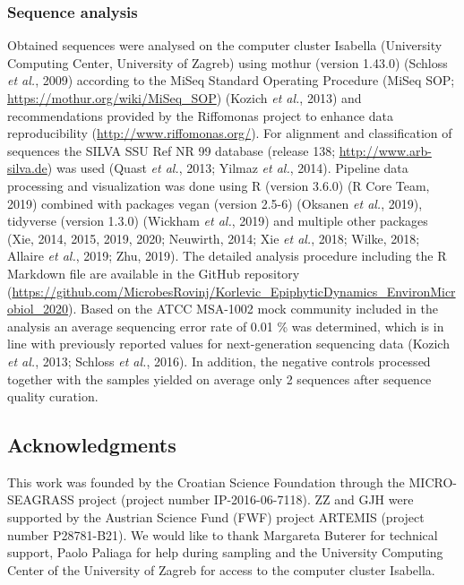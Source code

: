\documentclass[12pt,]{article}
\begin{document}
\hypertarget{sequence-analysis}{%
\subsubsection{Sequence analysis}\label{sequence-analysis}}

Obtained sequences were analysed on the computer cluster Isabella
(University Computing Center, University of Zagreb) using mothur
(version 1.43.0) (Schloss \emph{et al.}, 2009) according to the MiSeq
Standard Operating Procedure (MiSeq SOP;
\url{https://mothur.org/wiki/MiSeq_SOP}) (Kozich \emph{et al.}, 2013)
and recommendations provided by the Riffomonas project to enhance data
reproducibility (\url{http://www.riffomonas.org/}). For alignment and
classification of sequences the SILVA SSU Ref NR 99 database (release
138; \url{http://www.arb-silva.de}) was used (Quast \emph{et al.}, 2013;
Yilmaz \emph{et al.}, 2014). Pipeline data processing and visualization
was done using R (version 3.6.0) (R Core Team, 2019) combined with
packages vegan (version 2.5-6) (Oksanen \emph{et al.}, 2019), tidyverse
(version 1.3.0) (Wickham \emph{et al.}, 2019) and multiple other
packages (Xie, 2014, 2015, 2019, 2020; Neuwirth, 2014; Xie \emph{et
al.}, 2018; Wilke, 2018; Allaire \emph{et al.}, 2019; Zhu, 2019). The
detailed analysis procedure including the R Markdown file are available
in the GitHub repository
(\url{https://github.com/MicrobesRovinj/Korlevic_EpiphyticDynamics_EnvironMicrobiol_2020}).
Based on the ATCC MSA-1002 mock community included in the analysis an
average sequencing error rate of 0.01 \si{\percent} was determined,
which is in line with previously reported values for next-generation
sequencing data (Kozich \emph{et al.}, 2013; Schloss \emph{et al.},
2016). In addition, the negative controls processed together with the
samples yielded on average only 2 sequences after sequence quality
curation.

\hypertarget{acknowledgments}{%
\subsection{Acknowledgments}\label{acknowledgments}}

This work was founded by the Croatian Science Foundation through the
MICRO-SEAGRASS project (project number IP-2016-06-7118). ZZ and GJH were
supported by the Austrian Science Fund (FWF) project ARTEMIS (project
number P28781-B21). We would like to thank Margareta Buterer for
technical support, Paolo Paliaga for help during sampling and the
University Computing Center of the University of Zagreb for access to
the computer cluster Isabella.
\end{document}
